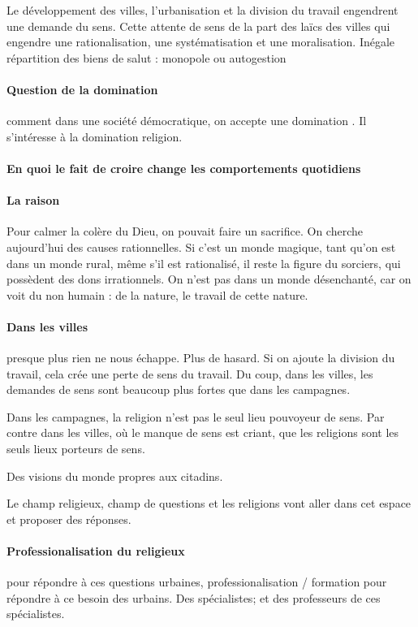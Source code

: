  Le développement des villes, l’urbanisation et la division du travail engendrent une demande du sens.  Cette attente de sens de la part des laïcs des villes qui engendre une rationalisation, une systématisation et une moralisation. Inégale répartition des biens de salut : monopole ou autogestion

\paragraph{Question de la domination} comment dans une société démocratique, on accepte une domination . Il s'intéresse à la domination religion.

\paragraph{En quoi le fait de croire change les comportements quotidiens} 

\paragraph{La raison} Pour calmer la colère du Dieu, on pouvait faire un sacrifice. On cherche aujourd'hui des causes rationnelles. Si c'est un monde magique, tant qu'on est dans un monde rural, même s'il est rationalisé, il reste la figure du sorciers, qui possèdent des dons irrationnels. On n'est pas dans un monde désenchanté, car on voit du non humain : de la nature, le travail de cette nature. 

\paragraph{Dans les villes} presque plus rien ne nous échappe. Plus de hasard. Si on ajoute la division du travail, cela crée une perte de sens du travail. Du coup, dans les villes, les demandes de sens sont beaucoup plus fortes que dans les campagnes.

Dans les campagnes, la religion n'est pas le seul lieu pouvoyeur de sens. Par contre dans les villes, où le manque de sens est criant, que les religions sont les seuls lieux porteurs de sens.
\begin{Prop}
    Des visions du monde propres aux citadins. 
\end{Prop}
Le champ religieux, champ de questions et les religions vont aller dans cet espace et proposer des réponses. 

\paragraph{Professionalisation du religieux} pour répondre à ces questions urbaines, professionalisation / formation pour répondre à ce besoin des urbains. Des spécialistes; et des professeurs de ces spécialistes.

